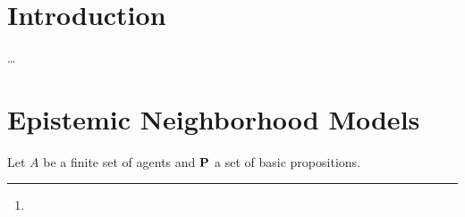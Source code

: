 \documentclass[12pt]{article}
\title{\ourtitle{}}
\author{\jan{}\\{}{\small\janAffiliation{}} \and
  \bryan{}\footnote{\bryanFunding{}}\\{}{\small\bryanAffiliation{}}}
\theoremstyle{definition}
\newcommand{\Prop}{{\bf P}}    %
\begin{document}
\maketitle

\begin{abstract}
  \noindent 
  We study update of neighborhood models for belief with neighborhood
  models for communication and change. Our main motivation for this is
  that the update construction for such model is better behaved than
  the product update of Kripke models for belief with Kripke event
  models.
\end{abstract}

\section{Introduction}

\ldots 

\section{Epistemic Neighborhood Models} 

Let $A$ be a finite set of agents and $\Prop$ a set of basic propositions. 
\end{document}
